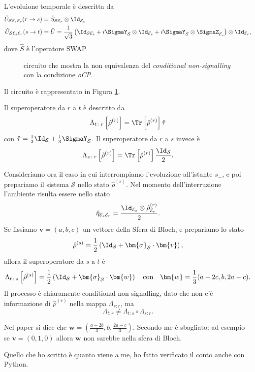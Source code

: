 \documentclass[a4]{article}
\begin{document}
L'evoluìone temporale è descritta da
\begin{align*}
	\hat{U}_{\mathcal{S}\mathcal{E}_s\mathcal{E}_r}(r \to s) &= 
	  \hat{S}_{\mathcal{S}\mathcal{E}_r} \otimes \Id_{\mathcal{E}_s} \\
	\hat{U}_{\mathcal{S}\mathcal{E}_s\mathcal{E}_r}(s \to t) &=
	  \hat{U} = \frac{1}{\sqrt{3}}\left(\Id_{\mathcal{S}\mathcal{E}_s} +
	    	                            i \SigmaY_{\mathcal{S}} \otimes \Id_{\mathcal{E}_s} +
	    	                            i \SigmaY_{\mathcal{S}} \otimes \SigmaZ_{\mathcal{E}_s}
	    	                      \right) \otimes \Id_{\mathcal{E}_r},    	    	                              
\end{align*}
dove \(\hat{S}\) è l'operatore SWAP.
\begin{figure}
	\centering
	
	\caption{circuito che mostra la non equivalenza del \emph{conditional non-signalling}
		con la condizione \emph{oCP}.}
	\label{fig:cnsNocp}
\end{figure}
Il circuito è rappresentato in Figura \ref{fig:cnsNocp}.

Il superoperatore da \(r\) a \(t\) è descritto da 
\[\Lambda_{t\colon r} \left[\hat{\rho}^{(r)}\right] =
    \Tr\left[\hat{\rho}^{(r)}\right] \hat{\tau} \]
con \(\hat{\tau} = \frac{1}{2}\Id_\mathcal{S} + \frac{1}{3}\SigmaY_\mathcal{S}\).
Il superoperatore da \(r\) a \(s\) invece è 
\[\Lambda_{s\colon r} \left[\hat{\rho}^{(r)}\right] =
    \Tr\left[\hat{\rho}^{(r)}\right] \frac{\Id_\mathcal{S}}{2}. \]
    
Consideriamo ora il caso in cui interrompiamo l'evoluzione all'istante \(s_-\), e poi
prepariamo il sistema \(\mathcal{S}\) nello stato \(\hat{\rho}^{(s)}\). Nel momento
dell'interruzione l'ambiente risulta essere nello stato
\[\hat{\eta}_{\mathcal{E}_s\mathcal{E}_r} =
      \frac{\Id_{\mathcal{E}_s}\otimes\hat{\rho}^{(r)}_{\mathcal{E}_r}}{2}.\]
Se fissiamo \(\bm{v} = (a,b,c)\) un vettore della Sfera di Bloch, e prepariamo lo
stato 
\[\hat{\rho}^{(s)} =
     \frac{1}{2} \left( \Id_\mathcal{S} + \bm{\sigma}_\mathcal{S} \cdot \bm{v} \right),\]
allora il superoperatore da \(s\) a \(t\) è 
\[\Lambda_{t\colon s} \left[\hat{\rho}^{(s)}\right] =
     \frac{1}{2} \left( \Id_\mathcal{S} + \bm{\sigma}_\mathcal{S} \cdot \bm{w} \right)
     \quad \text{con} \quad \bm{w} = \frac{1}{3} (a-2c, b, 2a-c). \]
 Il processo è chiaramente conditional non-signalling, dato che non c'è informazione
 di \(\hat{\rho}^{(r)}\) nella mappa
\(\Lambda_{s\colon r}\), ma 
\[\Lambda_{t\colon r} \not= \Lambda_{t\colon s} \circ \Lambda_{s\colon r}.\]
\begin{tcolorbox}[colback=red!5!white,colframe=red!75!black,title=Attenzione!]
	Nel paper \cite{CPdoesnotimply} si dice che 
	\(\bm{w} = (\frac{a-2b}{3}, b, \frac{2a-c}{3})\). Secondo me è sbagliato: 
	ad esempio se \(\bm{v} = (0,1,0)\) allora \(\bm{w}\) non sarebbe nella
	sfera di Bloch.
	
	Quello che ho scritto è quanto viene a me, ho fatto verificato
	il conto anche con Python.
\end{tcolorbox}
\end{document}
